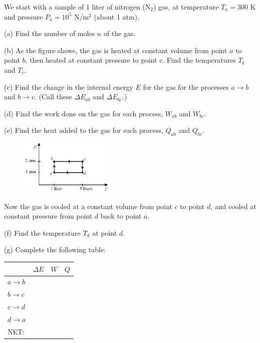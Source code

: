 We start with a sample of 1 liter of nitrogen ($\textrm{N}_2$) gas, at temperature $T_a = 300$ K and pressure $P_a = 10^5$ N/m$^2$ (about 1 atm).

(a) Find the number of moles $n$ of the gas.
\answerspace{1.0in}

(b) As the figure shows, the gas is heated at constant volume from point $a$ to point $b$, then heated at constant pressure to point $c$.  Find the temperatures $T_b$ and $T_c$.  
\answerspace{1.4in}

(c) Find the change in the internal energy $E$ for the gas for the processes $a \rightarrow b$ and $b \rightarrow c$.  (Call these $\Delta E_{ab}$ and $\Delta E_{bc}$.)
\answerspace{1.5in}

\pagebreak
(d) Find the work done on the gas for each process, $W_{ab}$ and $W_{bc}$.  
\answerspace{1.3in}

(e) Find the heat added to the gas for each process, $Q_{ab}$ and $Q_{bc}$.  
\answerspace{1.3in}

\begin{figure}
  \vspace{-0.2 in}
  \includegraphics[width=0.4\textwidth]{ideal_gas_cycles/square_cycle2.eps}
\end{figure}

Now the gas is cooled at a constant volume from point $c$ to point $d$, and cooled at constant pressure from point $d$ back to point $a$.  

(f) Find the temperature $T_d$ at point $d$.
\answerspace{1.5in}

(g) Complete the following table:


\vspace{0.1 in}
{\renewcommand{\arraystretch}{2.0}
\begin{tabular}{| C{1in} |C{1in} | C{1in} | C{1in} |}
\hline
& $\Delta E$ & $W$ & $Q$ \\ \hline
$a \rightarrow b$ & & & \\ \hline
$b \rightarrow c$ & & & \\ \hline
$c \rightarrow d$ & & & \\ \hline
$d \rightarrow a$ & & & \\
\hhline{|=|=|=|=|}
NET: & & & \\ \hline
\end{tabular}
}

